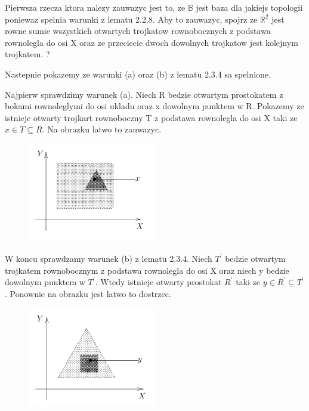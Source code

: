 \documentclass{article}
\begin{document}
Pierwsza rzecza ktora nalezy zauwazyc jest to, ze $\mathbb{B}$ jest baza dla jakiejs topologii poniewaz spelnia warunki z lematu 2.2.8. Aby to zauwazyc, spojrz ze $\mathbb{R}^{2}$ jest rowne sumie wszystkich otwartych trojkatow rownobocznych z podstawa rownolegla do osi X oraz ze przeciecie dwoch dowolnych trojkatow jest kolejnym trojkatem. ?

Nastepnie pokazemy ze warunki (a) oraz (b) z lematu 2.3.4 sa spelnione.

Najpierw sprawdzimy warunek (a). Niech R bedzie otwartym prostokatem z bokami rownoleglymi do osi ukladu oraz x dowolnym punktem w R. Pokazemy ze istnieje otwarty trojkart rownoboczny T z podstawa rownolegla do osi X taki ze $x \in T \subseteq R$. Na obrazku latwo to zauwazyc.

\begin{figure}[h]
   \centering
   \includegraphics[width=0.5\textwidth]{trojkat2.png}
\end{figure}

W koncu sprawdzamy warunek (b) z lematu 2.3.4. Niech $T^{\prime}$ bedzie otwartym trojkatem rownobocznym z podstawa rownolegla do osi X oraz niech y bedzie dowolnym punktem w $T^{\prime}$. Wtedy istnieje otwarty prostokat $R^{\prime}$ taki ze $y \in R^{\prime} \subseteq T^{\prime}$. Ponownie na obrazku jest latwo to dostrzec.

\begin{figure}[h]
   \centering
   \includegraphics[width=0.5\textwidth]{trojkat3.png}
\end{figure}
\end{document}
